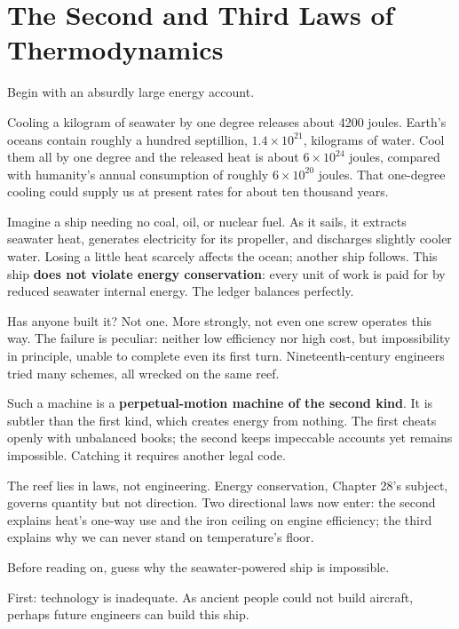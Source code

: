 \chapter{The Second and Third Laws of Thermodynamics}


Begin with an absurdly large energy account.

Cooling a kilogram of seawater by one degree releases about 4200 joules. Earth's oceans contain roughly a hundred septillion, \(1.4\times10^{21}\), kilograms of water. Cool them all by one degree and the released heat is about \(6\times10^{24}\) joules, compared with humanity's annual consumption of roughly \(6\times10^{20}\) joules. That one-degree cooling could supply us at present rates for about ten thousand years.

Imagine a ship needing no coal, oil, or nuclear fuel. As it sails, it extracts seawater heat, generates electricity for its propeller, and discharges slightly cooler water. Losing a little heat scarcely affects the ocean; another ship follows. This ship \textbf{does not violate energy conservation}: every unit of work is paid for by reduced seawater internal energy. The ledger balances perfectly.

Has anyone built it? Not one. More strongly, not even one screw operates this way. The failure is peculiar: neither low efficiency nor high cost, but impossibility in principle, unable to complete even its first turn. Nineteenth-century engineers tried many schemes, all wrecked on the same reef.

Such a machine is a \textbf{perpetual-motion machine of the second kind}. It is subtler than the first kind, which creates energy from nothing. The first cheats openly with unbalanced books; the second keeps impeccable accounts yet remains impossible. Catching it requires another legal code.

The reef lies in laws, not engineering. Energy conservation, Chapter 28's subject, governs quantity but not direction. Two directional laws now enter: the second explains heat's one-way use and the iron ceiling on engine efficiency; the third explains why we can never stand on temperature's floor.


Before reading on, guess why the seawater-powered ship is impossible.

First: technology is inadequate. As ancient people could not build aircraft, perhaps future engineers can build this ship.

